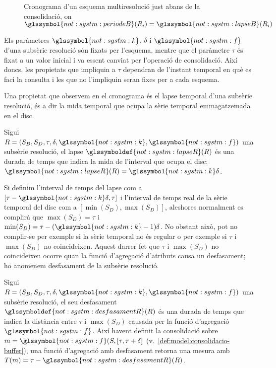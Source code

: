 \begin{figure}[tp]
  \centering
  
  \caption{Cronograma d'un esquema multiresolució just abans de la consolidació,  on $\glssymbol{not:sgstm:periodeB}(R_i)=\glssymbol{not:sgstm:lapseB}(R_i)$}
  \label{fig:model:cronograma}
\end{figure}


Els paràmetres $\glssymbol{not:sgstm:k}$, $\delta$ i
$\glssymbol{not:sgstm:f}$ d'una subsèrie resolució són fixats per
l'esquema, mentre que el paràmetre $\tau$ és fixat a un valor inicial
i va essent canviat per l'operació de consolidació. Així doncs, les
propietats que impliquin a $\tau$ dependran de l'instant temporal en
què es faci la consulta i les que no l'impliquin seran fixes per a
cada esquema.

Una propietat que observem en el cronograma és el lapse temporal d'una
subsèrie resolució, és a dir la mida temporal que ocupa
la sèrie temporal emmagatzemada en el disc.
\begin{definition} %
  Sigui $R=(S_B,S_D,\tau,\delta,\glssymbol{not:sgstm:k},\glssymbol{not:sgstm:f})$ una subsèrie resolució, el lapse
  $\glssymboldef{not:sgstm:lapseR}(R)$ és una durada de temps que
  indica la mida de l'interval que ocupa el disc:
  $\glssymbol{not:sgstm:lapseR}(R) = \glssymbol{not:sgstm:k}\delta$.
\end{definition}


Si definim l'interval de temps del lapse com a $[\tau - \glssymbol{not:sgstm:k}\delta,
\tau]$ i l'interval de temps real de la sèrie temporal del disc com a
$[\min(S_D),\max(S_D)]$, aleshores normalment es complirà que
$\max(S_D)=\tau$ i $\min(S_D)=\tau - (\glssymbol{not:sgstm:k}-1)\delta$. No obstant això,
pot no complir-se per exemple si la sèrie temporal no és regular o per
exemple si $\tau$ i $\max(S_D)$ no coincideixen.  Aquest darrer fet
que $\tau$ i $\max(S_D)$ no coincideixen ocorre quan la funció
d'agregació d'atributs causa un desfasament; ho anomenem desfasament
de la subsèrie resolució.
\begin{definition} %
  \label{def:sgstm:desdsamentR}
  Sigui
  $R=(S_B,S_D,\tau,\delta,\glssymbol{not:sgstm:k},\glssymbol{not:sgstm:f})$
  una subsèrie resolució, el seu desfasament
  $\glssymboldef{not:sgstm:desfasamentR}(R)$ és una durada de temps
  que indica la distància entre $\tau$ i $\max(S_D)$ causada per la
  funció d'agregació $\glssymbol{not:sgstm:f}$. Així havent definit la
  consolidació sobre $m=\glssymbol{not:sgstm:f}(S,[\tau,\tau+\delta]$
  (v.~\autoref{def:model:consolidacio-buffer}), una funció d'agregació
  amb desfasament retorna una mesura amb $T(m)=\tau -
  \glssymbol{not:sgstm:desfasamentR}(R)$.
\end{definition}



